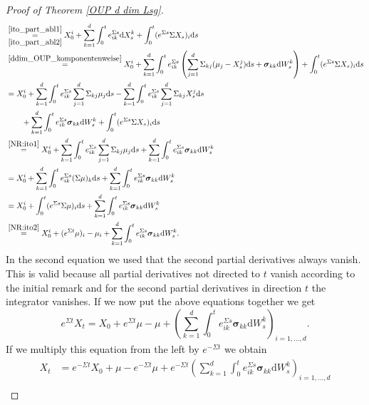 \documentclass[11pt,titlepage]{article}
\theoremstyle{definition}
\theoremstyle{remark}
\begin{document}
\begin{proof}[Proof of Theorem \ref{OUP d dim Lsg}]
\begin{align*}
			&\overset{\ref{ito_part_abl1}}{\underset{\ref{ito_part_abl2}}{=}} X_0^i +\sum_{k=1}^d \int_0^t 
			e^{\Sigma s}_{ik}\mathrm{d}X^k_s +\int_0^t (e^{\Sigma s}\Sigma X_s)_i\mathrm{d}s\\
			&\overset{\ref{ddim_OUP_komponentenweise}}{=}X_0^i +\sum_{k=1}^d \int_0^t 
			e^{\Sigma s}_{ik}\left(\sum_{j=1}^d \Sigma_{kj}(\mu_j-X_s^j)\mathrm{d}s+\boldsymbol{\sigma}_{kk} \mathrm{d}W_s^k\right) +\int_0^t (e^{\Sigma s}\Sigma X_s)_i\mathrm{d}s\\
			&=X_0^i +\sum_{k=1}^d \int_0^t 
			e^{\Sigma s}_{ik}\sum_{j=1}^d \Sigma_{kj}\mu_j\mathrm{d}s -\sum_{k=1}^d \int_0^t 
			e^{\Sigma s}_{ik}\sum_{j=1}^d \Sigma_{kj}X_s^j\mathrm{d}s\\
			&\qquad+\sum_{k=1}^d \int_0^t 
			e^{\Sigma s}_{ik}\boldsymbol{\sigma}_{kk} \mathrm{d}W_s^k +\int_0^t (e^{\Sigma s}\Sigma X_s)_i\mathrm{d}s\\
			&\overset{\ref{NR:ito1}}{=}X_0^i +\sum_{k=1}^d \int_0^t 
			e^{\Sigma s}_{ik}\sum_{j=1}^d \Sigma_{kj}\mu_j\mathrm{d}s+\sum_{k=1}^d \int_0^t 
			e^{\Sigma s}_{ik}\boldsymbol{\sigma}_{kk} \mathrm{d}W_s^k\\
			&=X_0^i +\sum_{k=1}^d \int_0^t 
			e^{\Sigma s}_{ik} (\Sigma\mu)_k\mathrm{d}s+\sum_{k=1}^d \int_0^t 
			e^{\Sigma s}_{ik}\boldsymbol{\sigma}_{kk} \mathrm{d}W_s^k\\
			&=X_0^i + \int_0^t 
			(e^{\Sigma s}\Sigma\mu)_i\mathrm{d}s+\sum_{k=1}^d \int_0^t 
			e^{\Sigma s}_{ik}\boldsymbol{\sigma}_{kk} \mathrm{d}W_s^k\\
			&\overset{\ref{NR:ito2}}{=}X_0^i + (e^{\Sigma t}\mu)_i -\mu_i+\sum_{k=1}^d \int_0^t 
			e^{\Sigma s}_{ik}\boldsymbol{\sigma}_{kk} \mathrm{d}W_s^k.
		\end{align*}
		In the second equation we used that the second partial derivatives always vanish. This is valid because all partial derivatives not directed to $t$ vanish according to the initial remark and for the second partial derivatives in direction $t$ the integrator vanishes. 
		If we now put the above equations together we get 
		\[e^{\Sigma t}X_t=X_0+e^{\Sigma t}\mu-\mu +\left(\sum_{k=1}^d\int_0^t 
		e^{\Sigma s}_{ik}\boldsymbol{\sigma}_{kk}\mathrm{d}W_s^k\right)_{i=1,\ldots,d}.\]
		If we multiply this equation from the left by $e^{-\Sigma t}$ we obtain
		\begin{align*}
			X_t &= e^{-\Sigma t}X_0 +\mu -e^{-\Sigma t}\mu +e^{-\Sigma t}\left(\sum_{k=1}^d\int_0^t 
			e^{\Sigma s}_{ik}\boldsymbol{\sigma}_{kk}\mathrm{d}W_s^k\right)_{i=1,\ldots,d}\\

\end{align*}
\end{proof}
\end{document}
